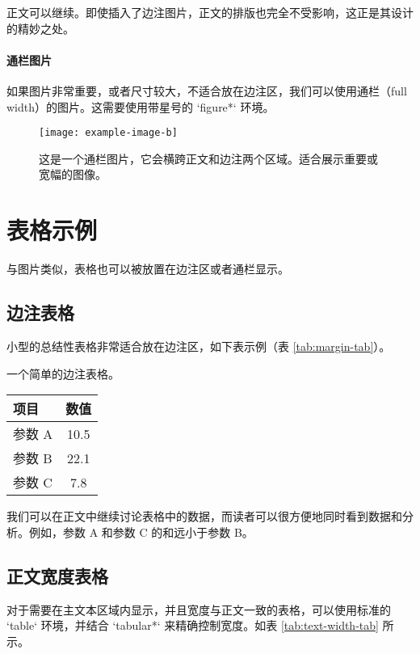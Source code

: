 \documentclass[nols, a4paper]{tufte-handout}
\begin{document}
正文可以继续。即使插入了边注图片，正文的排版也完全不受影响，这正是其设计的精妙之处。\lipsum[2][1-3]

\paragraph{通栏图片} 
如果图片非常重要，或者尺寸较大，不适合放在边注区，我们可以使用通栏（full width）的图片。这需要使用带星号的 `figure*` 环境。

\begin{figure*}
  \texttt{[image: example-image-b]}
  \caption{这是一个通栏图片，它会横跨正文和边注两个区域。适合展示重要或宽幅的图像。}
  \label{fig:full-fig}
\end{figure*}


\section{表格示例}

与图片类似，表格也可以被放置在边注区或者通栏显示。

\subsection{边注表格}

小型的总结性表格非常适合放在边注区，如下表示例（表 \ref{tab:margin-tab}）。
\begin{margintable}
  \caption{一个简单的边注表格。}
  \label{tab:margin-tab}
  \centering
  \begin{tabular}{l c}
    \toprule
    项目 & 数值 \\
    \midrule
    参数 A & 10.5 \\
    参数 B & 22.1 \\
    参数 C & 7.8  \\
    \bottomrule
  \end{tabular}
\end{margintable}
我们可以在正文中继续讨论表格中的数据，而读者可以很方便地同时看到数据和分析。例如，参数 A 和参数 C 的和远小于参数 B。

\subsection{正文宽度表格}

对于需要在主文本区域内显示，并且宽度与正文一致的表格，可以使用标准的 `table` 环境，并结合 `tabular*` 来精确控制宽度。如表 \ref{tab:text-width-tab} 所示。
\end{document}

